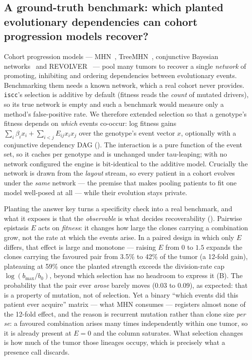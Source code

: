 \documentclass{article}
\begin{document}
\subsection{A ground-truth benchmark: which planted evolutionary dependencies can cohort progression models recover?}
\label{sec:epistasis}
Cohort progression models --- MHN~\cite{schill_modelling_2020}, TreeMHN~\cite{luo_joint_2023},
conjunctive Bayesian networks~\cite{gerstung_quantifying_2009} and
REVOLVER~\cite{caravagna_detecting_2018} --- pool many tumors to recover a single \emph{network} of
promoting, inhibiting and ordering dependencies between evolutionary events. Benchmarking them needs
a known network, which a real cohort never provides. \texttt{iscc}'s selection is additive by default
(fitness reads the \emph{count} of mutated drivers), so its true network is empty and such a benchmark
would measure only a method's false-positive rate. We therefore extended selection so that a genotype's
fitness depends on \emph{which} events co-occur: log fitness gains
$\sum_i \beta_i x_i + \sum_{i<j} E_{ij} x_i x_j$ over the genotype's event vector $x$, optionally with
a conjunctive dependency DAG (). The interaction is a pure function of the
event set, so it caches per genotype and is unchanged under tau-leaping; with no network configured
the engine is bit-identical to the additive model. Crucially the network is drawn from the
\emph{layout} stream, so every patient in a cohort evolves under the \emph{same} network --- the
premise that makes pooling patients to fit one model well-posed at all --- while their evolution stays
private.

Planting the answer key turns a specificity check into a real benchmark, and what it exposes is that
the \emph{observable} is what decides recoverability (). Pairwise epistasis $E$
acts on \emph{fitness}: it changes how large the clones carrying a combination grow, not the rate at
which the events arise. In a paired design in which only $E$ differs, that effect is large and
monotone --- raising $E$ from $0$ to $1.5$ expands the clones carrying the favoured pair from 3.5\% to
42\% of the tumor (a 12-fold gain), plateauing at 59\% once the planted strength exceeds the
division-rate cap $\log(b_{\max}/b_0)$, beyond which selection has no headroom to express it
(B). The probability that the pair ever \emph{arose} barely moves (0.03 to 0.09),
as expected: that is a property of mutation, not of selection. Yet a binary ``which events did this
patient ever acquire'' matrix --- what MHN consumes --- registers almost none of the 12-fold effect,
and the reason is recurrent mutation rather than clone size \emph{per se}: a favoured combination
arises many times independently within one tumor, so it is already present at $E=0$ and the column
saturates. What selection changes is how much of the tumor those lineages occupy, which is precisely
what a presence call discards.
\end{document}
